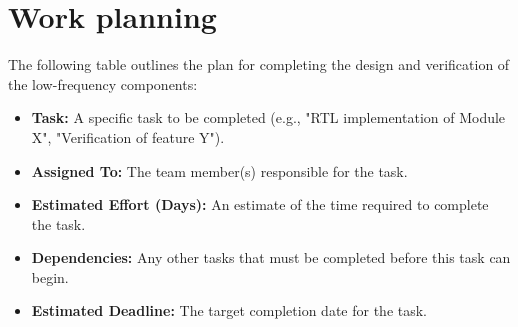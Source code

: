\section{Work planning}
The following table outlines the plan for completing the design and verification of the low-frequency components:

\begin{itemize}[nosep]
    \item \textbf{Task:} A specific task to be completed (e.g., "RTL implementation of Module X", "Verification of feature Y").
    \item \textbf{Assigned To:} The team member(s) responsible for the task.
    \item \textbf{Estimated Effort (Days):} An estimate of the time required to complete the task.
    \item \textbf{Dependencies:} Any other tasks that must be completed before this task can begin.
    \item \textbf{Estimated Deadline:} The target completion date for the task.
\end{itemize}

